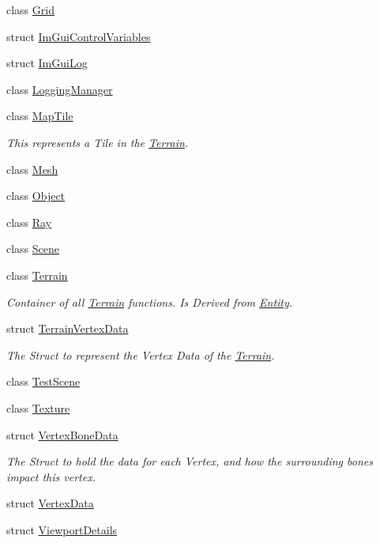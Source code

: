 \begin{DoxyCompactItemize}
class \mbox{\hyperlink{classpiolot_1_1_grid}{Grid}}
\item 
struct \mbox{\hyperlink{structpiolot_1_1_im_gui_control_variables}{Im\+Gui\+Control\+Variables}}
\item 
struct \mbox{\hyperlink{structpiolot_1_1_im_gui_log}{Im\+Gui\+Log}}
\item 
class \mbox{\hyperlink{classpiolot_1_1_logging_manager}{Logging\+Manager}}
\item 
class \mbox{\hyperlink{classpiolot_1_1_map_tile}{Map\+Tile}}
\begin{DoxyCompactList}\small\item\em This represents a Tile in the \mbox{\hyperlink{classpiolot_1_1_terrain}{Terrain}}. \end{DoxyCompactList}\item 
class \mbox{\hyperlink{classpiolot_1_1_mesh}{Mesh}}
\item 
class \mbox{\hyperlink{classpiolot_1_1_object}{Object}}
\item 
class \mbox{\hyperlink{classpiolot_1_1_ray}{Ray}}
\item 
class \mbox{\hyperlink{classpiolot_1_1_scene}{Scene}}
\item 
class \mbox{\hyperlink{classpiolot_1_1_terrain}{Terrain}}
\begin{DoxyCompactList}\small\item\em Container of all \mbox{\hyperlink{classpiolot_1_1_terrain}{Terrain}} functions. Is Derived from \mbox{\hyperlink{classpiolot_1_1_entity}{Entity}}. \end{DoxyCompactList}\item 
struct \mbox{\hyperlink{structpiolot_1_1_terrain_vertex_data}{Terrain\+Vertex\+Data}}
\begin{DoxyCompactList}\small\item\em The Struct to represent the Vertex Data of the \mbox{\hyperlink{classpiolot_1_1_terrain}{Terrain}}. \end{DoxyCompactList}\item 
class \mbox{\hyperlink{classpiolot_1_1_test_scene}{Test\+Scene}}
\item 
class \mbox{\hyperlink{classpiolot_1_1_texture}{Texture}}
\item 
struct \mbox{\hyperlink{structpiolot_1_1_vertex_bone_data}{Vertex\+Bone\+Data}}
\begin{DoxyCompactList}\small\item\em The Struct to hold the data for each Vertex, and how the surrounding bones impact this vertex. \end{DoxyCompactList}\item 
struct \mbox{\hyperlink{structpiolot_1_1_vertex_data}{Vertex\+Data}}
\item 
struct \mbox{\hyperlink{structpiolot_1_1_viewport_details}{Viewport\+Details}}
\end{DoxyCompactItemize}
